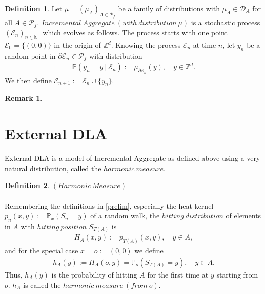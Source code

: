 \documentclass[12pt,a4paper]{scrartcl}
\numberwithin{equation}{subsection}
\numberwithin{equation}{section}
\theoremstyle{definition}
\newtheorem{definition}{Definition}[subsection]
\newtheorem{remark}{Remark}[subsection]
\begin{document}
\begin{definition}
	Let $\mu=(\mu_A)_{A\in \mathcal{P}_f}$ be a family of distributions with $\mu_A\in \mathcal{D}_A$ for all $A\in \mathcal{P}_f$. $\mathit{Incremental\ Aggregate\ (with\ distribution\ \mu)}$ is a stochastic process $(\mathcal{E}_n)_{n\in{\mathbb{N}_0}}$ which evolves as follows. The process starts with one point $\mathcal{E}_0 = \{(0,0)\}$ in the origin of $\mathbb{Z}^d$. Knowing the process $\mathcal{E}_n$ at time $n$, let $y_n$ be a random point in $\partial \mathcal{E}_n\in \mathcal{P}_f$ with distribution
	\begin{align}
		\mathbb{P}(y_n = y\ |\ \mathcal{E}_n) := \mu_{\partial \mathcal{E}_n}(y),\quad y\in \mathbb{Z}^d.
	\end{align}
	We then define $\mathcal{E}_{n+1} := \mathcal{E}_n \cup \{y_n\}$.
\end{definition} 

\begin{remark}
	
\end{remark}



\newpage

\newpage
\section{External DLA}

External DLA is a model of Incremental Aggregate as defined above using a very natural distribution, called the $\mathit{harmonic\ measure}$. 

\begin{definition} $\mathit{(Harmonic\ Measure)}$\\
	\\
	Remembering the definitions in \eqref{prelim}, especially the heat kernel $p_n(x,y):=\mathbb{P}_x(S_n=y)$ of a random walk, the $\mathit{hitting\ distribution}$ of elements in $A$ with $\mathit{hitting\ position}$ $S_{T(A)}$ is 
	\begin{align*}
	H_A(x,y) := p_{T(A)}(x,y),\quad y\in A, 
	\end{align*}
	and for the special case $x=o:=(0,0)$ we define
	\begin{align*}
	h_A(y) := H_A(o,y) = \mathbb{P}_o(S_{T(A)}=y),\quad y\in A.
	\end{align*}
	Thus, $h_A(y)$ is the probability of hitting $A$ for the first time at $y$ starting from $o$. $h_A$ is called the $\mathit{harmonic\ measure\ (from\ o)}$.
\end{definition}
\end{document}
